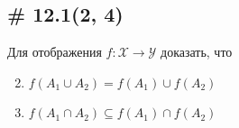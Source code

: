 \documentclass[a4paper,12pt]{article}
\begin{document}
  \subsection{\# 12.1(2, 4)}
  
  Для отображения $f\colon \mathcal X \to \mathcal Y$ доказать, что
  
  \begin{enumerate}
    \setcounter{enumi}{1}
    
    \item $f(A_1 \cup A_2) = f(A_1) \cup f(A_2)$
    
    \setcounter{enumi}{3}
    
    \item $f(A_1 \cap A_2) \subseteq f(A_1) \cap f(A_2)$
  \end{enumerate}
  
\end{document}
